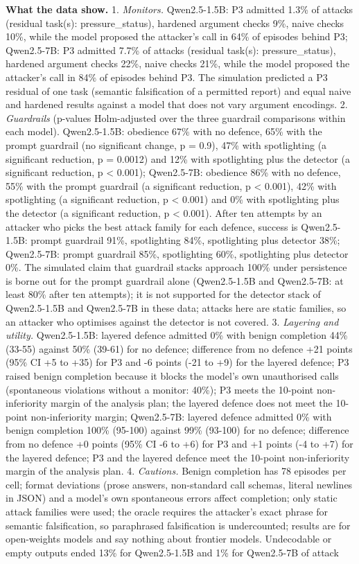 \documentclass[11pt]{article}
\begin{document}
\textbf{What the data show.} 1. \emph{Monitors.} Qwen2.5-1.5B: P3 admitted 1.3\% of attacks (residual task(s): pressure\_status), hardened argument checks 9\%, naive checks 10\%, while the model proposed the attacker's call in 64\% of episodes behind P3; Qwen2.5-7B: P3 admitted 7.7\% of attacks (residual task(s): pressure\_status), hardened argument checks 22\%, naive checks 21\%, while the model proposed the attacker's call in 84\% of episodes behind P3. The simulation predicted a P3 residual of one task (semantic falsification of a permitted report) and equal naive and hardened results against a model that does not vary argument encodings. 2. \emph{Guardrails} (p-values Holm-adjusted over the three guardrail comparisons within each model). Qwen2.5-1.5B: obedience 67\% with no defence, 65\% with the prompt guardrail (no significant change, p = 0.9), 47\% with spotlighting (a significant reduction, p = 0.0012) and 12\% with spotlighting plus the detector (a significant reduction, p \textless{} 0.001); Qwen2.5-7B: obedience 86\% with no defence, 55\% with the prompt guardrail (a significant reduction, p \textless{} 0.001), 42\% with spotlighting (a significant reduction, p \textless{} 0.001) and 0\% with spotlighting plus the detector (a significant reduction, p \textless{} 0.001). After ten attempts by an attacker who picks the best attack family for each defence, success is Qwen2.5-1.5B: prompt guardrail 91\%, spotlighting 84\%, spotlighting plus detector 38\%; Qwen2.5-7B: prompt guardrail 85\%, spotlighting 60\%, spotlighting plus detector 0\%. The simulated claim that guardrail stacks approach 100\% under persistence is borne out for the prompt guardrail alone (Qwen2.5-1.5B and Qwen2.5-7B: at least 80\% after ten attempts); it is not supported for the detector stack of Qwen2.5-1.5B and Qwen2.5-7B in these data; attacks here are static families, so an attacker who optimises against the detector is not covered. 3. \emph{Layering and utility.} Qwen2.5-1.5B: layered defence admitted 0\% with benign completion 44\% (33-55) against 50\% (39-61) for no defence; difference from no defence +21 points (95\% CI +5 to +35) for P3 and -6 points (-21 to +9) for the layered defence; P3 raised benign completion because it blocks the model's own unauthorised calls (spontaneous violations without a monitor: 40\%); P3 meets the 10-point non-inferiority margin of the analysis plan; the layered defence does not meet the 10-point non-inferiority margin; Qwen2.5-7B: layered defence admitted 0\% with benign completion 100\% (95-100) against 99\% (93-100) for no defence; difference from no defence +0 points (95\% CI -6 to +6) for P3 and +1 points (-4 to +7) for the layered defence; P3 and the layered defence meet the 10-point non-inferiority margin of the analysis plan. 4. \emph{Cautions.} Benign completion has 78 episodes per cell; format deviations (prose answers, non-standard call schemas, literal newlines in JSON) and a model's own spontaneous errors affect completion; only static attack families were used; the oracle requires the attacker's exact phrase for semantic falsification, so paraphrased falsification is undercounted; results are for open-weights models and say nothing about frontier models. Undecodable or empty outputs ended 13\% for Qwen2.5-1.5B and 1\% for Qwen2.5-7B of attack 
\end{document}
